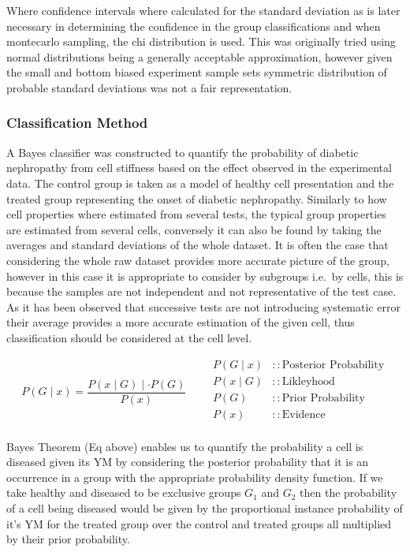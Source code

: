 \documentclass[
  paper=a4,
  ,captions=tableheading
]{scrartcl}
\begin{document}
Where confidence intervals where calculated for the standard deviation
as is later necessary in determining the confidence in the group
classifications and when montecarlo sampling, the chi distribution is
used. This was originally tried using normal distributions being a
generally acceptable approximation, however given the small and bottom
biased experiment sample sets symmetric distribution of probable
standard deviations was not a fair representation.

\subsubsection{Classification Method}\label{classification-method}

A Bayes classifier was constructed to quantify the probability of
diabetic nephropathy from cell stiffness based on the effect observed in
the experimental data. The control group is taken as a model of healthy
cell presentation and the treated group representing the onset of
diabetic nephropathy. Similarly to how cell properties where estimated
from several tests, the typical group properties are estimated from
several cells, conversely it can also be found by taking the averages
and standard deviations of the whole dataset. It is often the case that
considering the whole raw dataset provides more accurate picture of the
group, however in this case it is appropriate to consider by subgroups
i.e.~by cells, this is because the samples are not independent and not
representative of the test case. As it has been observed that successive
tests are not introducing systematic error their average provides a more
accurate estimation of the given cell, thus classification should be
considered at the cell level.

\[
{  
P(G \mid x) = \frac{P(x \mid G) \mid \cdot P(G)}{P(x)}  
}  
\qquad  
\begin{align}  
P(G \mid x) &:: \text{Posterior Probability}\\
P(x \mid G) &:: \text{Likleyhood}\\
P(G)   &:: \text{Prior Probability}\\
P(x)   &:: \text{Evidence}\\
\end{align}
\]

Bayes Theorem (Eq above) enables us to quantify the probability a cell
is diseased given its YM by considering the posterior probability that
it is an occurrence in a group with the appropriate probability density
function. If we take healthy and diseased to be exclusive groups
\(G_{1}\) and \(G_{2}\) then the probability of a cell being diseased
would be given by the proportional instance probability of it's YM for
the treated group over the control and treated groups all multiplied by
their prior probability.
\end{document}

